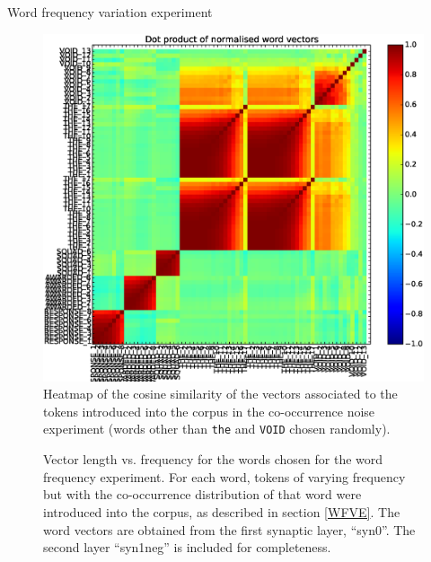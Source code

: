 \documentclass{article} %
\newcommand{\word}[1]{\texttt{#1}}
\begin{document}
\begin{section}{Word frequency variation experiment}
\begin{figure}\label{word-frequency-experiment-heatmap}
	\includegraphics[scale=0.5]{word-frequency-experiment-heatmap}
	\caption{
	Heatmap of the cosine similarity of the vectors associated to the
	tokens introduced into the corpus in the co-occurrence noise experiment
	(words other than \word{the} and \word{VOID} chosen randomly).
	}
\end{figure}

\begin{figure}\label{fig:word-frequency-experiment-graph}
	\caption{
	Vector length vs. frequency for the words chosen for the word frequency
	experiment.  For each word, tokens of varying frequency but with the
	co-occurrence distribution of that word were introduced into the
	corpus, as described in section \ref{WFVE}.
	The word vectors are obtained from the first synaptic layer, ``syn0''.
	The second layer ``syn1neg'' is included for completeness.
	}
\end{figure}

\end{section}
\end{document}
